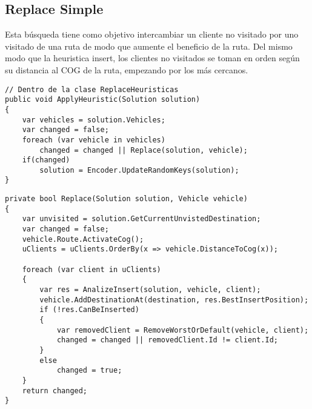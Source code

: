 \subsection{Replace Simple}

Esta búsqueda tiene como objetivo intercambiar un cliente no visitado por uno visitado de una ruta de modo que aumente el beneficio de la ruta. Del mismo modo que la heuristica insert, los clientes no visitados se toman en orden según su distancia al COG de la ruta, empezando por los más cercanos.

\begin{minipage}{\textwidth}
\begin{lstlisting}
// Dentro de la clase ReplaceHeuristicas
public void ApplyHeuristic(Solution solution)
{	
	var vehicles = solution.Vehicles;
	var changed = false;	
	foreach (var vehicle in vehicles)
		changed = changed || Replace(solution, vehicle);
	if(changed)
		solution = Encoder.UpdateRandomKeys(solution);
}
\end{lstlisting}
\end{minipage}

\begin{minipage}{\textwidth}
\begin{lstlisting}
private bool Replace(Solution solution, Vehicle vehicle)
{
	var unvisited = solution.GetCurrentUnvistedDestination;
	var changed = false;
	vehicle.Route.ActivateCog();
	uClients = uClients.OrderBy(x => vehicle.DistanceToCog(x));	

	foreach (var client in uClients)
	{
		var res = AnalizeInsert(solution, vehicle, client);
		vehicle.AddDestinationAt(destination, res.BestInsertPosition);
		if (!res.CanBeInserted)
		{
			var removedClient = RemoveWorstOrDefault(vehicle, client);
			changed = changed || removedClient.Id != client.Id;
		}
		else
			changed = true;
	}
	return changed;
}
\end{lstlisting}
\end{minipage}

\bigskip

